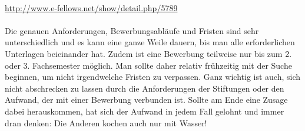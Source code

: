 \\
\url{http://www.e-fellows.net/show/detail.php/5789}\\
\\
Die genauen Anforderungen, Bewerbungsabläufe und Fristen sind sehr unterschiedlich und es kann eine ganze Weile dauern, bis man alle erforderlichen Unterlagen beieinander hat. Zudem ist eine Bewerbung teilweise nur bis zum 2. oder 3. Fachsemester möglich. Man sollte daher relativ frühzeitig mit der Suche beginnen, um nicht irgendwelche Fristen zu verpassen. Ganz wichtig ist auch, sich nicht abschrecken zu lassen durch die Anforderungen der Stiftungen oder den Aufwand, der mit einer Bewerbung verbunden ist. Sollte am Ende eine Zusage dabei herauskommen, hat sich der Aufwand in jedem Fall gelohnt und immer dran denken: Die Anderen kochen auch nur mit Wasser!

